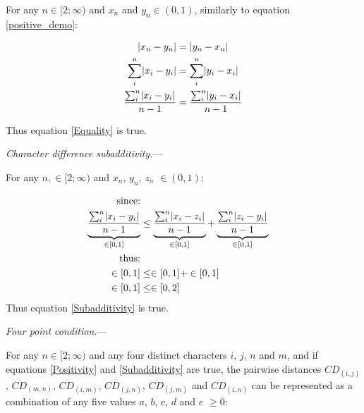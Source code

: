 \documentclass[12pt,letterpaper]{article}
\DeclarePairedDelimiter\abs{\lvert}{\rvert}%
\renewcommand{\subsection}[1]{%
\bigskip
\begin{center}
\begin{large}
\normalfont\itshape #1
\end{large}
\end{center}}
\renewcommand{\subsection}[1]{%
\vspace{2ex}
\noindent
\textit{#1.}---}
\begin{document}
For any $n \in [2;\infty)$ and $x_{n}$ and $y_{n} \in (0,1)$, similarly to equation \ref{positive_demo}:

\begin{equation}
    \label{equality_demo}
    \begin{aligned}
    \abs{x_{n}-y_{n}} &= \abs{y_{n}-x_{n}}\\
    \sum_{i}^{n}\abs{x_{i}-y_{i}} &= \sum_{i}^{n}\abs{y_{i}-x_{i}}\\
    \frac{\sum_{i}^{n}\abs{x_{i}-y_{i}}}{n-1} &= \frac{\sum_{i}^{n}\abs{y_{i}-x_{i}}}{n-1}\\
    \end{aligned}
\end{equation}

Thus equation \ref{Equality} is true.

\subsection{Character difference subadditivity}

For any $n, \in [2;\infty)$ and $x_{n}$, $y_{n}$, $z_{n}$ $\in (0,1)$:

\begin{equation}
    \label{equality_demo}
    \begin{aligned}
    \text{since:}\\
    \underbrace{\frac{\sum_{i}^{n}\abs{x_{i}-y_{i}}}{n-1}}_{\in[0,1]}
    &\leq
    \underbrace{\frac{\sum_{i}^{n}\abs{x_{i}-z_{i}}}{n-1}}_{\in[0,1]}
    +
    \underbrace{\frac{\sum_{i}^{n}\abs{z_{i}-y_{i}}}{n-1}}_{\in[0,1]}\\
    \text{thus:}\\
    \in[0,1] &\leq \in[0,1] + \in[0,1] \\
    \in[0,1] &\leq \in[0,2]\\
    \end{aligned}
\end{equation}
Thus equation \ref{Subadditivity} is true.


\newpage

\subsection{Four point condition}

For any $n \in [2;\infty)$ and any four distinct characters $i$, $j$, $n$ and $m$, and if equations \ref{Positivity} and \ref{Subadditivity} are true, the pairwise distances $CD_{(i,j)}$, $CD_{(m,n)}$, $CD_{(i,m)}$, $CD_{(j,n)}$, $CD_{(j,m)}$ and $CD_{(i,n)}$ can be represented as a combination of any five values $a$, $b$, $c$, $d$ and $e$ $\geq 0$:
\end{document}
